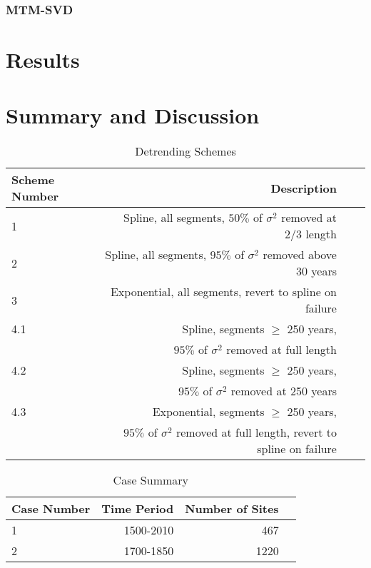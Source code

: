 \documentclass[smallextended]{svjour3}       %
\begin{document}
\subsubsection{MTM-SVD}

\section{Results}
\label{results}


\section{Summary and Discussion}



 

\clearpage
\newpage

\begin{table}[!tbp]
\centering
\begin{tabular}{lrrr}
\toprule
             Scheme Number &     Description \\
\midrule

1 & Spline, all segments, $50\%$ of $\sigma^2$ removed at $2/3$ length \\
2 & Spline, all segments, $95\%$ of $\sigma^2$ removed above 30 years \\
3 & Exponential, all segments, revert to spline on failure \\
4.1 & Spline, segments $\geq$ 250 years, \\
& $95\%$ of $\sigma^2$ removed at full length  \\
4.2 & Spline, segments $\geq$ 250 years, \\
& $95\%$ of $\sigma^2$ removed at 250 years \\
4.3 & Exponential, segments $\geq$ 250 years, \\
& $95\%$ of $\sigma^2$ removed at full length, revert to spline on failure \\

\bottomrule
\end{tabular}
\caption{Detrending Schemes}
\label{dt_schemes}
\end{table}


\begin{table}[!tbp]
\centering
\begin{tabular}{lrrr}
\toprule
             Case Number & Time Period & Number of Sites \\
\midrule

1 & 1500-2010 & 467 \\
2 & 1700-1850 & 1220 \\

\bottomrule
\end{tabular}
\caption{Case Summary}
\label{cases}
\end{table}
\end{document}
